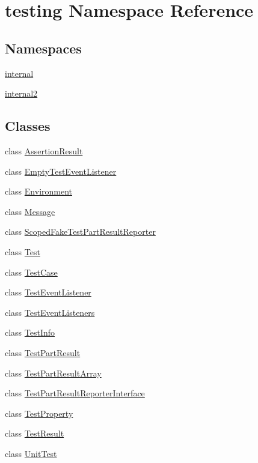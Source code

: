 \hypertarget{namespacetesting}{}\section{testing Namespace Reference}
\label{namespacetesting}
\subsection*{Namespaces}
\begin{DoxyCompactItemize}
\item 
 \mbox{\hyperlink{namespacetesting_1_1internal}{internal}}
\item 
 \mbox{\hyperlink{namespacetesting_1_1internal2}{internal2}}
\end{DoxyCompactItemize}
\subsection*{Classes}
\begin{DoxyCompactItemize}
\item 
class \mbox{\hyperlink{classtesting_1_1_assertion_result}{Assertion\+Result}}
\item 
class \mbox{\hyperlink{classtesting_1_1_empty_test_event_listener}{Empty\+Test\+Event\+Listener}}
\item 
class \mbox{\hyperlink{classtesting_1_1_environment}{Environment}}
\item 
class \mbox{\hyperlink{classtesting_1_1_message}{Message}}
\item 
class \mbox{\hyperlink{classtesting_1_1_scoped_fake_test_part_result_reporter}{Scoped\+Fake\+Test\+Part\+Result\+Reporter}}
\item 
class \mbox{\hyperlink{classtesting_1_1_test}{Test}}
\item 
class \mbox{\hyperlink{classtesting_1_1_test_case}{Test\+Case}}
\item 
class \mbox{\hyperlink{classtesting_1_1_test_event_listener}{Test\+Event\+Listener}}
\item 
class \mbox{\hyperlink{classtesting_1_1_test_event_listeners}{Test\+Event\+Listeners}}
\item 
class \mbox{\hyperlink{classtesting_1_1_test_info}{Test\+Info}}
\item 
class \mbox{\hyperlink{classtesting_1_1_test_part_result}{Test\+Part\+Result}}
\item 
class \mbox{\hyperlink{classtesting_1_1_test_part_result_array}{Test\+Part\+Result\+Array}}
\item 
class \mbox{\hyperlink{classtesting_1_1_test_part_result_reporter_interface}{Test\+Part\+Result\+Reporter\+Interface}}
\item 
class \mbox{\hyperlink{classtesting_1_1_test_property}{Test\+Property}}
\item 
class \mbox{\hyperlink{classtesting_1_1_test_result}{Test\+Result}}
\item 
class \mbox{\hyperlink{classtesting_1_1_unit_test}{Unit\+Test}}
\end{DoxyCompactItemize}

